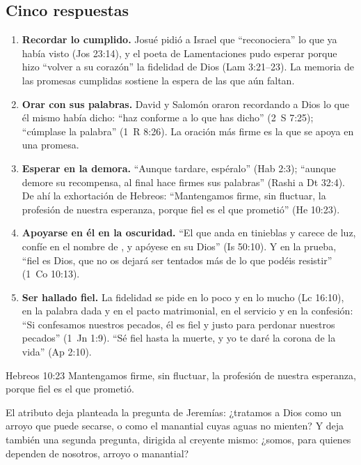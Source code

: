 \subsection{Cinco respuestas}
\begin{enumerate}
\item \textbf{Recordar lo cumplido.} Josué pidió a Israel que ``reconociera'' lo que ya había visto (Jos 23:14), y el poeta de Lamentaciones pudo esperar porque hizo ``volver a su corazón'' la fidelidad de Dios (Lam 3:21--23). La memoria de las promesas cumplidas sostiene la espera de las que aún faltan.
\item \textbf{Orar con sus palabras.} David y Salomón oraron recordando a Dios lo que él mismo había dicho: ``haz conforme a lo que has dicho'' (2~S 7:25); ``cúmplase la palabra'' (1~R 8:26). La oración más firme es la que se apoya en una promesa.
\item \textbf{Esperar en la demora.} ``Aunque tardare, espéralo'' (Hab 2:3); ``aunque demore su recompensa, al final hace firmes sus palabras'' (Rashi a Dt 32:4). De ahí la exhortación de Hebreos: ``Mantengamos firme, sin fluctuar, la profesión de nuestra esperanza, porque fiel es el que prometió'' (He 10:23).
\item \textbf{Apoyarse en él en la oscuridad.} ``El que anda en tinieblas y carece de luz, confíe en el nombre de \SENOR, y apóyese en su Dios'' (Is 50:10). Y en la prueba, ``fiel es Dios, que no os dejará ser tentados más de lo que podéis resistir'' (1~Co 10:13).
\item \textbf{Ser hallado fiel.} La fidelidad se pide en lo poco y en lo mucho (Lc 16:10), en la palabra dada y en el pacto matrimonial, en el servicio y en la confesión: ``Si confesamos nuestros pecados, él es fiel y justo para perdonar nuestros pecados'' (1~Jn 1:9). ``Sé fiel hasta la muerte, y yo te daré la corona de la vida'' (Ap 2:10).
\end{enumerate}

\begin{verso}{Hebreos 10:23}
Mantengamos firme, sin fluctuar, la profesión de nuestra esperanza, porque fiel es el que prometió.
\end{verso}

El atributo deja planteada la pregunta de Jeremías: ¿tratamos a Dios como un arroyo que puede secarse, o como el manantial cuyas aguas no mienten? Y deja también una segunda pregunta, dirigida al creyente mismo: ¿somos, para quienes dependen de nosotros, arroyo o manantial?

